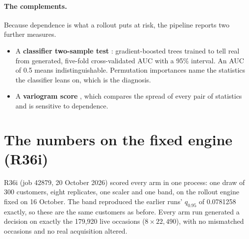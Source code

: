 \documentclass[11pt]{article}
\begin{document}
\paragraph{The complements.} Because dependence is what a rollout puts at risk,
the pipeline reports two further measures.
\begin{itemize}
\item A \textbf{classifier two-sample test} \citep{lopezpaz2017}: gradient-boosted
  trees trained to tell real from generated, five-fold cross-validated AUC with
  a 95\% interval. An AUC of 0.5 means indistinguishable. Permutation importances
  name the statistics the classifier leans on, which is the diagnosis.
\item A \textbf{variogram score} \citep{scheuerer2015}, which compares the
  spread of every pair of statistics and is sensitive to dependence.
\end{itemize}

\section{The numbers on the fixed engine (R36i)}\label{sec:results}

R36i (job 42879, 20 October 2026) scored every arm in one process: one draw of
300 customers, eight replicates, one scaler and one band, on the rollout engine
fixed on 16 October. The band reproduced the earlier runs' $q_{0.95}$ of
0.0781258 exactly, so these are the same customers as before. Every arm run
generated a decision on exactly the 179,920 live occasions ($8 \times 22{,}490$),
with no mismatched occasions and no real acquisition altered.
\end{document}
